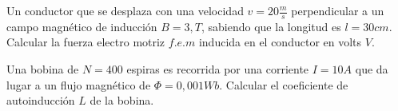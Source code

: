 \documentclass[./examen.tex]{subfiles}
\begin{document}
\begin{center}
\end{center}
\begin{questions}

 \question[5] Un conductor que se desplaza con una velocidad $v=20\frac{m}{s}$ perpendicular a un campo magnético de inducción $B=3,T$, sabiendo que la longitud es $l=30cm$. Calcular la fuerza electro motriz $f.e.m$ inducida en el conductor en volts $V$.
 
 \begin{center}
 \end{center}
 
 \question[5]  Una bobina de $N=400$ espiras es recorrida por una corriente $I=10A$ que da lugar a un flujo magnético de $\Phi=0,001Wb$. Calcular el coeficiente de autoinducción $L$ de la bobina.
 \vspace{1cm}
 \end{questions}
 
 
\end{document}
